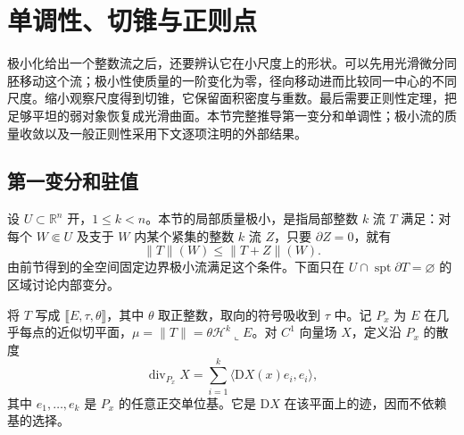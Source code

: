 
% 
% 

\section{单调性、切锥与正则点}
\label{g3:sec:2303}
极小化给出一个整数流之后，还要辨认它在小尺度上的形状。可以先用光滑微分同胚移动这个流；极小性使质量的一阶变化为零，径向移动进而比较同一中心的不同尺度。缩小观察尺度得到切锥，它保留面积密度与重数。最后需要正则性定理，把足够平坦的弱对象恢复成光滑曲面。本节完整推导第一变分和单调性；极小流的质量收敛以及一般正则性采用下文逐项注明的外部结果。

\subsection{第一变分和驻值}
\label{g3:subsec:2303:01}
设 \(U\subset\mathbb R^n\) 开，\(1\le k<n\)。本节的局部质量极小，是指局部整数 \(k\) 流 \(T\) 满足：对每个 \(W\Subset U\) 及支于 \(W\) 内某个紧集的整数 \(k\) 流 \(Z\)，只要 \(\partial Z=0\)，就有
\[
	\|T\|(W)\le\|T+Z\|(W).
\]
由前节得到的全空间固定边界极小流满足这个条件。下面只在 \(U\cap\operatorname{spt}\partial T=\varnothing\) 的区域讨论内部变分。

\ProseParagraphBreak
将 \(T\) 写成 \(\lBrack E,\tau,\theta\rBrack\)，其中 \(\theta\) 取正整数，取向的符号吸收到 \(\tau\) 中。记 \(P_x\) 为 \(E\) 在几乎每点的近似切平面，\(\mu=\|T\|=\theta\mathcal H^k\llcorner E\)。对 \(C^1\) 向量场 \(X\)，定义沿 \(P_x\) 的散度
\[
	\operatorname{div}_{P_x}X
	=\sum_{i=1}^k\langle \mathrm DX(x)e_i,e_i\rangle,
\]
其中 \(e_1,\ldots,e_k\) 是 \(P_x\) 的任意正交单位基。它是 \(\mathrm DX\) 在该平面上的迹，因而不依赖基的选择。

